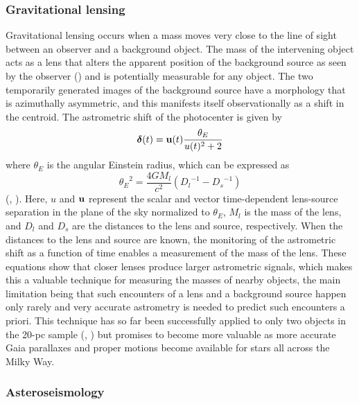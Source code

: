 \documentclass[twocolumn,tighten,twocolappendix]{aastex631}
\begin{document}
\subsubsection{Gravitational lensing}

Gravitational lensing occurs when a mass moves very close to the line of sight between an observer and a background object. The mass of the intervening object acts as a lens that alters the apparent position of the background source as seen by the observer (\citealt{gaudi2012}) and is potentially measurable for any object. The two temporarily generated images of the background source have a morphology that is azimuthally asymmetric, and this manifests itself observationally as a shift in the centroid. The astrometric shift of the photocenter is given by 
\begin{equation}
    {\boldsymbol \delta}(t) = {\bf u}(t)\frac{\theta_E}{u(t)^2 + 2}
\end{equation}
where $\theta_E$ is the angular Einstein radius, which can be expressed as 
\begin{equation}
    {\theta_E}^2 = \frac{4GM_l}{c^2}({D_l}^{-1} - {D_s}^{-1}) 
\end{equation}
(\citealt{walker1995}, \citealt{lu2016}). Here, $u$ and $\bf{u}$ represent the scalar and vector time-dependent lens-source separation in the plane of the sky normalized to $\theta_E$, $M_l$ is the mass of the lens, and $D_l$ and $D_s$ are the distances to the lens and source, respectively. When the distances to the lens and source are known, the monitoring of the astrometric shift as a function of time enables a measurement of the mass of the lens. These equations show that closer lenses produce larger astrometric signals, which makes this a valuable technique for measuring the masses of nearby objects, the main limitation being that such encounters of a lens and a background source happen only rarely and very accurate astrometry is needed to predict such encounters a priori. This technique has so far been successfully applied to only two objects in the 20-pc sample (\citealt{sahu2017}, \citealt{zurlo2018}) but promises to become more valuable as more accurate Gaia parallaxes and proper motions become available for stars all across the Milky Way.

\subsubsection{Asteroseismology}
\end{document}
